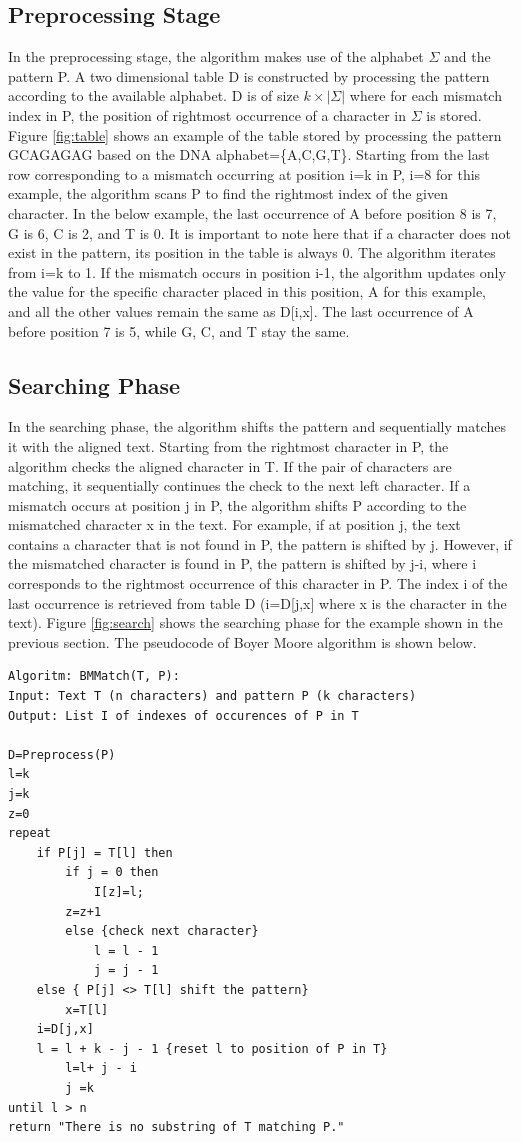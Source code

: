 \documentclass[paper=a4, fontsize=11pt]{scrartcl} %
\numberwithin{equation}{section} %
\numberwithin{figure}{section} %
\numberwithin{table}{section} %
\begin{document}
\subsection{Preprocessing Stage}
In the preprocessing stage, the algorithm makes use of the alphabet $\Sigma$ and the pattern P. A two dimensional table D is constructed by processing the pattern according to the available alphabet. D is of size $k\times|\Sigma|$ where for each mismatch index in P, the position of rightmost occurrence of a character in $\Sigma$ is stored. Figure \ref{fig:table} shows an example of the table stored by processing the pattern GCAGAGAG based on the DNA alphabet=\{A,C,G,T\}. Starting from the last row corresponding to a mismatch occurring at position i=k in P, i=8 for this example, the algorithm scans P to find the rightmost index of the given character. In the below example, the last occurrence of A before position 8 is 7, G is 6, C is 2, and T is 0. It is important to note here that if a character does not exist in the pattern, its position in the table is always 0. The algorithm iterates from i=k to 1. If the mismatch occurs in position i-1, the algorithm updates only the value for the specific character placed in this position, A for this example, and all the other values remain the same as D[i,x]. The last occurrence of A before position 7 is 5, while G, C, and T stay the same.


\subsection{Searching Phase}

In the searching phase, the algorithm shifts the pattern and sequentially matches it with the aligned text. Starting from the rightmost character in P, the algorithm checks the aligned character in T. If the pair of characters are matching, it sequentially continues the check to the next left character. If a mismatch occurs at position j in P, the algorithm shifts P according to the mismatched character x in the text. For example, if at position j, the text contains a character that is not found in P, the pattern is shifted by j. However, if the mismatched character is found in P, the pattern is shifted by j-i, where i corresponds to the rightmost occurrence of this character in P. The index i of the last occurrence is retrieved from table D (i=D[j,x] where x is the character in the text). Figure \ref{fig:search} shows the searching phase for the example shown in the previous section. The pseudocode of Boyer Moore algorithm is shown below.\\
\begin{lstlisting}
Algoritm: BMMatch(T, P):
Input: Text T (n characters) and pattern P (k characters)
Output: List I of indexes of occurences of P in T

D=Preprocess(P)
l=k
j=k
z=0
repeat
    if P[j] = T[l] then
        if j = 0 then
            I[z]=l;
	    z=z+1
        else {check next character}
            l = l - 1
            j = j - 1
    else { P[j] <> T[l] shift the pattern}
        x=T[l]
	i=D[j,x]
	l = l + k - j - 1 {reset l to position of P in T}
        l=l+ j - i
        j =k
until l > n
return "There is no substring of T matching P."
\end{lstlisting}
\end{document}
